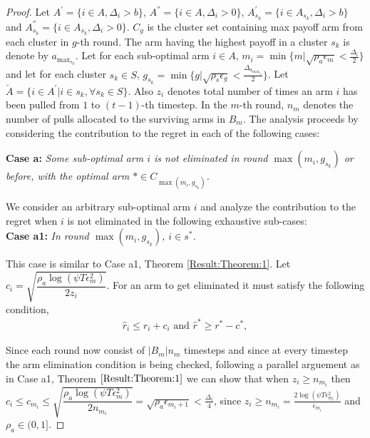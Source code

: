\begin{proof}
\label{sec:proofTheorem1}
Let $A^{'}=\lbrace i \in A,\Delta_{i}> b\rbrace$,  $A^{''}=\lbrace i \in A, \Delta_{i} > 0\rbrace$, $A^{'}_{s_{k}}=\lbrace i \in A_{s_{k}},\Delta_{i}> b\rbrace$ and $A^{''}_{s_{k}}=\lbrace i \in A_{s_{k}}, \Delta_{i} > 0 \rbrace$. $C_{g}$ is the cluster set containing max payoff arm from each cluster in $g$-th round. The arm having the highest payoff in a cluster $s_{k}$ is denote by $a_{\max_{s_{k}}}$. Let for each sub-optimal arm ${i}\in A$, $m_{i}=\min{\lbrace m|\sqrt{\rho_{a}\epsilon_{m}} < \frac{\Delta_{i}}{2} \rbrace}$ and let for each cluster $s_{k}\in S$, $g_{s_{k}}=\min{\lbrace g|\sqrt{\rho_{s}\epsilon_{g}} < \frac{\Delta_{a_{\max_{s_{k}}}}}{2} \rbrace}$. 
Let $\check{A}=\lbrace {i}\in A^{'} | {i}\in s_{k} , \forall s_{k}\in S \rbrace$. Also $z_{i}$ denotes total number of times an arm $i$ has been pulled from $1$ to $(t-1)$-th timestep. In the $m$-th round, $n_{m}$ denotes the number of pulls allocated to the surviving arms in $B_{m}$. The analysis proceeds by considering the contribution to the regret in each of the following cases:

\textbf{Case a:} \textit{Some sub-optimal arm ${i}$ is not eliminated in round $\max(m_{i},g_{s_{k}})$ or before, with the optimal arm ${*}\in C_{\max(m_{i},g_{s_{k}})}$.}

We consider an arbitrary sub-optimal arm ${i}$ and analyze the contribution to the regret when $i$ is not eliminated in the following exhaustive sub-cases:\\
\textbf{Case a1:} \textit{In round $\max(m_{i},g_{s_{k}})$, ${i} \in s^{*}$.}

This case is similar to Case a1, Theorem \ref{Result:Theorem:1}. Let $c_{i}=\sqrt{\dfrac{\rho_{a}\log{(\psi T\epsilon_{m}^{2})}}{2 z_{i}}}$. For an arm to get eliminated it must satisfy the following condition,
\begin{align}
\hat{r}_{i}  \le r_{i} + c_{i} \text{ and } 
\hat{r}^{*}\geq  r^{*} - c^{*}, \label{eq:armelim-casea2}
\end{align}

Since each round now consist of $|B_{m}|n_{m}$ timesteps and since at every timestep the arm elimination condition is being checked, following a parallel arguement as in Case a1, Theorem $\ref{Result:Theorem:1}$ we can show that when $z_{i} \geq n_{m_{i}}$ then \\ $c_{i} \leq c_{m_{i}} \leq \sqrt{\dfrac{\rho_{a}\log{(\psi T\epsilon_{m}^{2})}}{2 n_{m_{i}}}} = \sqrt{\rho_{a}\epsilon_{m_{i}+1}} < \frac{\Delta_{i}}{4}$, since $z_{i} \geq n_{m_{i}}=\frac{2\log{(\psi T\epsilon_{m_{i}}^{2})}}{\epsilon_{m_{i}}}$ and $\rho_{a}\in (0,1]$.


\end{proof}
